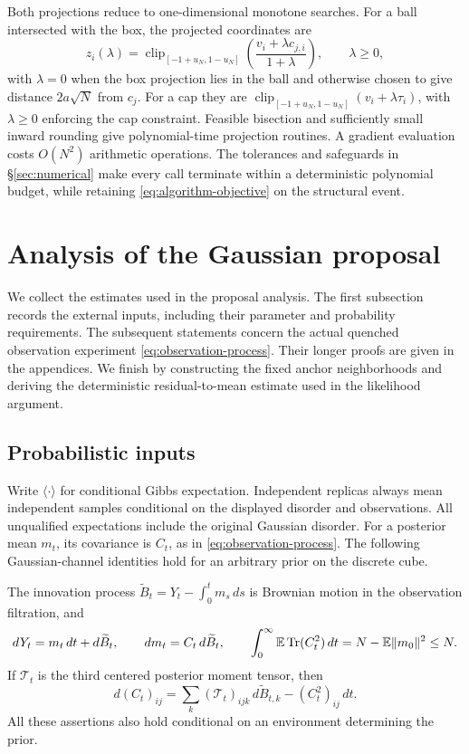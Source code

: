 \documentclass[11pt,reqno]{amsart}
\newcommand{\Tr}{\operatorname{Tr}}
\begin{document}
Both projections reduce to one-dimensional monotone searches. For a
ball intersected with the box, the projected coordinates are
\[
 z_i(\lambda)=\operatorname{clip}_{[-1+u_N,1-u_N]}
             \left(\frac{v_i+\lambda c_{j,i}}{1+\lambda}\right),
 \qquad \lambda\ge0,
\]
with $\lambda=0$ when the box projection lies in the ball and otherwise
chosen to give distance $2a\sqrt N$ from $c_j$. For a cap they are
$\operatorname{clip}_{[-1+u_N,1-u_N]}(v_i+\lambda\tau_i)$,
with $\lambda\ge0$ enforcing the cap constraint. Feasible bisection
and sufficiently small inward rounding give polynomial-time
projection routines. A gradient evaluation costs $O(N^2)$ arithmetic
operations. The tolerances and safeguards in \S\ref{sec:numerical}
make every call terminate within a deterministic polynomial budget,
while retaining \eqref{eq:algorithm-objective} on the structural event.


\section{Analysis of the Gaussian proposal}\label{sec:analysis}

We collect the estimates used in the proposal analysis. The first subsection records the external inputs, including their parameter and probability requirements. The subsequent statements concern the actual quenched observation experiment \eqref{eq:observation-process}. Their longer proofs are given in the appendices. We finish by constructing the fixed anchor neighborhoods and deriving the deterministic residual-to-mean estimate used in the likelihood argument.

\subsection{Probabilistic inputs}\label{sec:inputs}

Write $\langle\cdot\rangle$ for conditional Gibbs expectation. Independent replicas always mean independent samples conditional on the displayed disorder and observations. All unqualified expectations include the original Gaussian disorder. For a posterior mean $m_t$, its covariance is $C_t$, as in \eqref{eq:observation-process}. The following Gaussian-channel identities hold for an arbitrary prior on the discrete cube.

\begin{lem}\label{lem:filtering-input}
The innovation process $\widetilde B_t=Y_t-\int_0^t m_s\,ds$ is Brownian motion in the observation filtration, and
\begin{equation}\label{eq:posterior-budget}
 dY_t=m_t\,dt+d\widetilde B_t,\qquad
 dm_t=C_t\,d\widetilde B_t,\qquad
 \int_0^\infty\bbE\Tr(C_t^2)\,dt
       =N-\bbE\|m_0\|^2\le N.
\end{equation}
If $\mathcal T_t$ is the third centered posterior moment tensor, then
\[
 d(C_t)_{ij}=\sum_k(\mathcal T_t)_{ijk}\,d\widetilde B_{t,k}
                  -(C_t^2)_{ij}\,dt.
\]
All these assertions also hold conditional on an environment determining the prior.
\end{lem}
\end{document}
